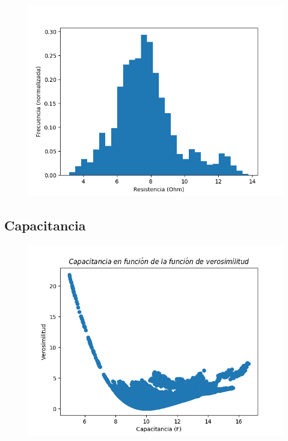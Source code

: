\documentclass[12pt,letterpaper]{article}
\begin{document}
\begin{figure}[H]
\includegraphics{r_hist.png}
\centering
\end{figure}

\subsection{Capacitancia}

\begin{figure}[H]
\includegraphics{c_verosimilitud.png}
\centering
\end{figure}
\end{document}
